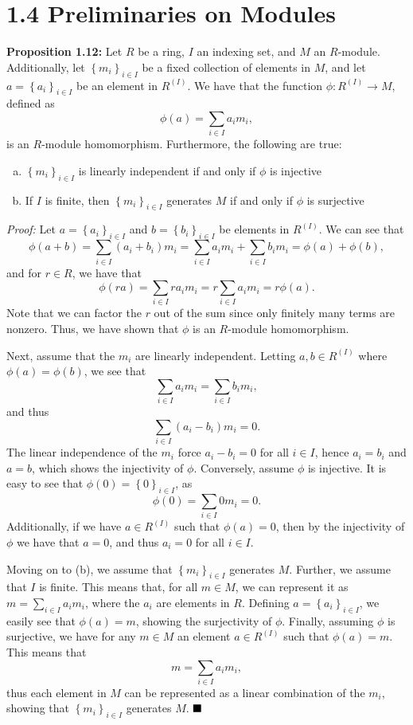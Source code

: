 \documentclass[12pt]{article}
\newcommand{\braceb}[1]{\left\{#1\right\}}
\newcommand{\proof}{\textit{Proof: }}
\newcommand{\done}{\ensuremath{\strut\hfill\blacksquare}}
\begin{document}
\section*{1.4 Preliminaries on Modules}

\textbf{Proposition 1.12:}
Let \( R \) be a ring, \( I \) an indexing set, and \( M \) an \( R \)-module.
Additionally, let \( \braceb{m_i}_{i \in I} \) be a fixed collection of
elements in \( M \), and let \( a = \braceb{a_i}_{i \in I} \) be an element in
\( R^{(I)} \).
We have that the function \( \phi : R^{(I)} \to M \), defined as
\[
	\phi(a) = \sum_{i \in I} a_im_i,
\]
is an \( R \)-module homomorphism.
Furthermore, the following are true:
\begin{enumerate}[(a)]
	\item \( \braceb{m_i}_{i \in I} \) is linearly independent if and only if
	      \( \phi \) is injective

	\item If \( I \) is finite, then \( \braceb{m_i}_{i \in I} \) generates
	      \( M \) if and only if \( \phi \) is surjective
\end{enumerate}

\proof
Let \( a = \braceb{a_i}_{i \in I} \) and \( b = \braceb{b_i}_{i \in I} \) be
elements in \( R^{(I)} \).
We can see that
\[
	\phi(a + b)
	= \sum_{i \in I} (a_i + b_i)m_i
	= \sum_{i \in I} a_im_i + \sum_{i \in I} b_im_i
	= \phi(a) + \phi(b),
\]
and for \( r \in R \), we have that
\[
	\phi(ra)
	= \sum_{i \in I} ra_im_i
	= r\sum_{i \in I} a_im_i
	= r\phi(a).
\]
Note that we can factor the \( r \) out of the sum since only finitely many
terms are nonzero.
Thus, we have shown that \( \phi \) is an \( R \)-module homomorphism.

Next, assume that the \( m_i \) are linearly independent.
Letting \( a, b \in R^{(I)} \) where \( \phi(a) = \phi(b) \), we see that
\[
	\sum_{i \in I} a_im_i = \sum_{i \in I} b_im_i,
\]
and thus
\[
	\sum_{i \in I} (a_i - b_i)m_i = 0.
\]
The linear independence of the \( m_i \) force \( a_i - b_i = 0 \) for all
\( i \in I \), hence \( a_i = b_i \) and \( a = b \), which shows the
injectivity of \( \phi \).
Conversely, assume \( \phi \) is injective.
It is easy to see that \( \phi(0) = \braceb{0}_{i \in I} \), as
\[
	\phi(0) = \sum_{i \in I} 0m_i = 0.
\]
Additionally, if we have \( a \in R^{(I)} \) such that \( \phi(a) = 0 \), then
by the injectivity of \( \phi \) we have that \( a = 0 \), and thus
\( a_i = 0 \) for all \( i \in I \).

Moving on to (b), we assume that \( \braceb{m_i}_{i \in I} \) generates
\( M \).
Further, we assume that \( I \) is finite.
This means that, for all \( m \in M \), we can represent it as
\( m = \sum_{i \in I} a_im_i \), where the \( a_i \) are elements in \( R \).
Defining \( a = \braceb{a_i}_{i \in I} \), we easily see that
\( \phi(a) = m \), showing the surjectivity of \( \phi \).
Finally, assuming \( \phi \) is surjective, we have for any \( m \in M \) an
element \( a \in R^{(I)} \) such that \( \phi(a) = m \).
This means that
\[
	m = \sum_{i \in I} a_im_i,
\]
thus each element in \( M \) can be represented as a linear combination of the
\( m_i \), showing that \( \braceb{m_i}_{i \in I} \) generates \( M \).
\done
\end{document}

